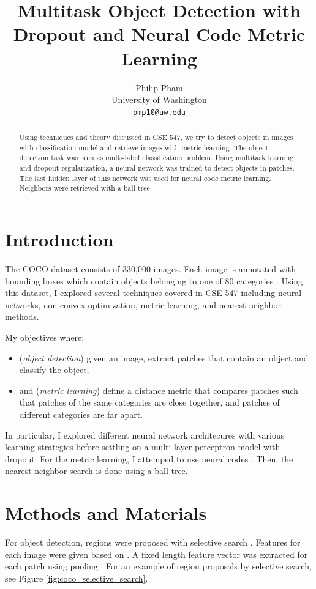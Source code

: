 \documentclass[letterpaper]{article}
\title{Multitask Object Detection with Dropout and Neural Code Metric Learning}
\author{
  Philip Pham \\
  University of Washington \\
  \href{pmp10@uw.edu}{\texttt{pmp10@uw.edu}} \\
}
\begin{document}
\maketitle

\begin{abstract}
  Using techniques and theory discussed in CSE 547, we try to detect objects in
  images with classification model and retrieve images with metric learning. The
  object detection task was seen as multi-label classification problem. Using
  multitask learning and dropout regularization, a neural network was trained to
  detect objects in patches. The last hidden layer of this network was used for
  neural code metric learning. Neighbors were retrieved with a ball tree.
\end{abstract}

\section{Introduction}

The COCO dataset consists of 330,000 images. Each image is annotated with
bounding boxes which contain objects belonging to one of 80 categories
\citep{coco}. Using this dataset, I explored several techniques covered in CSE
547 including neural networks, non-convex optimization, metric learning, and
nearest neighbor methods.

My objectives where:
\begin{itemize}
\item (\emph{object detection}) given an image, extract patches that contain an
  object and classify the object;
\item and (\emph{metric learning}) define a distance metric that compares
  patches such that patches of the same categories are close together, and
  patches of different categories are far apart.
\end{itemize}

In particular, I explored different neural network architecures with various
learning strategies before settling on a multi-layer perceptron model with
dropout. For the metric learning, I attemped to use neural codes
\citep{neural_codes}. Then, the nearest neighbor search is done using a ball
tree.

\section{Methods and Materials}

For object detection, regions were proposed with selective search
\citep{selective_search}. Features for each image were given based on
\cite{fast_rnn}. A fixed length feature vector was extracted for each patch
using pooling \citep{pooling}. For an example of region proposals by selective
search, see Figure \ref{fig:coco_selective_search}.
\end{document}
